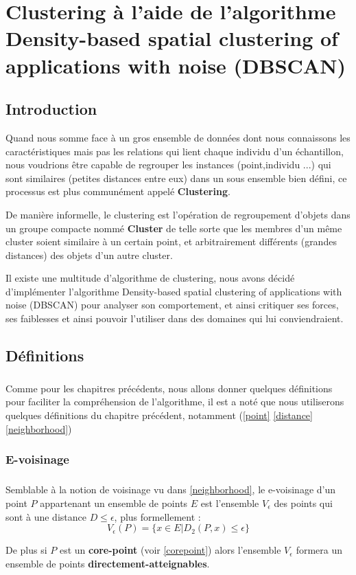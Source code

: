 \chapter{Clustering à l'aide de l'algorithme Density-based spatial clustering of applications with noise (DBSCAN)}
\section{Introduction}
	Quand nous somme face à un gros ensemble de données dont nous connaissons les caractéristiques mais pas les relations qui lient chaque individu d'un échantillon, nous voudrions être capable de regrouper les instances (point,individu ...) qui sont similaires (petites distances entre eux) dans un sous ensemble bien défini, ce processus est plus communément appelé \textbf{Clustering}.
	\par De manière informelle, le clustering est l'opération de regroupement d'objets dans un groupe compacte nommé \textbf{Cluster} de telle sorte que les membres d'un même cluster soient similaire à un certain point, et arbitrairement différents (grandes distances) des objets d'un autre cluster.
	\par 
	Il existe une multitude d'algorithme de clustering, nous avons décidé d'implémenter l'algorithme Density-based spatial clustering of applications with noise (DBSCAN) pour analyser son comportement, et ainsi critiquer ses forces, ses faiblesses et ainsi pouvoir l'utiliser dans des domaines qui lui conviendraient.
\section{Définitions}
	\paragraph{}
	Comme pour les chapitres précédents, nous allons donner quelques définitions pour faciliter la compréhension de l'algorithme, il est a noté que nous utiliserons quelques définitions du chapitre précédent, notamment (\ref{point} \ref{distance} \ref{neighborhood})
	\subsection{E-voisinage}
		\paragraph{}
		Semblable à la notion de voisinage vu dans \ref{neighborhood}, le e-voisinage d'un point $P$ appartenant un ensemble de points $E$ est l'ensemble $V_\epsilon$ des points qui sont à une distance $D \leq \epsilon$, plus formellement : 
		\[
			V_\epsilon(P) = \lbrace x \in E | D_2(P,x) \leq \epsilon \rbrace
		\] 
		\par De plus si $P$ est un \textbf{core-point} (voir \ref{corepoint}) alors l'ensemble $V_\epsilon$ formera un ensemble de points \textbf{directement-atteignables}.
